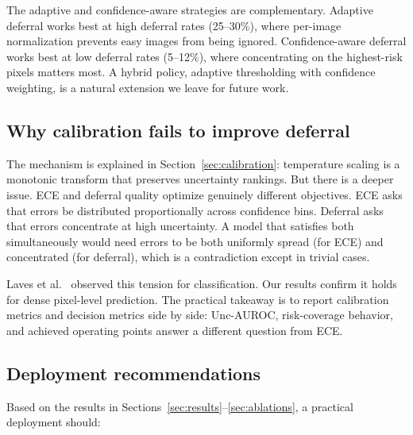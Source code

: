 The adaptive and confidence-aware strategies are complementary. Adaptive
deferral works best at high deferral rates (25--30\%), where per-image
normalization prevents easy images from being ignored. Confidence-aware
deferral works best at low deferral rates (5--12\%), where concentrating on
the highest-risk pixels matters most. A hybrid policy, adaptive
thresholding with confidence weighting, is a natural extension we leave
for future work.

\subsection{Why calibration fails to improve deferral}

The mechanism is explained in Section~\ref{sec:calibration}: temperature
scaling is a monotonic transform that preserves uncertainty rankings. But
there is a deeper issue. ECE and deferral quality optimize genuinely
different objectives. ECE asks that errors be distributed proportionally
across confidence bins. Deferral asks that errors concentrate at high
uncertainty. A model that satisfies both simultaneously would need errors
to be both uniformly spread (for ECE) and concentrated (for deferral),
which is a contradiction except in trivial cases.

Laves et al.\ \citep{laves2020well} observed this tension for classification.
Our results confirm it holds for dense pixel-level prediction. The practical
takeaway is to report calibration metrics and decision metrics side by side:
Unc-AUROC, risk-coverage behavior, and achieved operating points answer a
different question from ECE.

\subsection{Deployment recommendations}

Based on the results in Sections~\ref{sec:results}--\ref{sec:ablations},
a practical deployment should:

